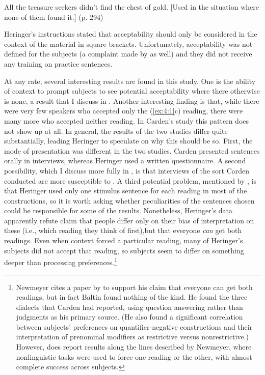 \ea\label{ex:4:3}
      All the treasure seekers didn't find the chest of gold. [Used in the situation where none of them found it.] (p. 294)    
\z

\noindent
Heringer's instructions stated that acceptability should only be considered  in the context of the material in square brackets. Unfortunately, acceptability was not defined for the subjects (a complaint made by \citet{Carden1970a} as well) and they did not receive any training on practice sentences.

At any rate, several interesting results are found in this study. One is the ability of context to prompt subjects to see potential acceptability where there otherwise is none, a result that I discuss in . Another interesting finding is that, while there were very few speakers who accepted only the (\ref{ex:4:1}c) reading, there were many more who accepted neither reading. In Carden's study  this  pattern does not show up at all. In general, the results of the two studies differ quite substantially, leading Heringer to speculate on why this should be so. First, the mode of presentation was different in the two studies. Carden presented sentences orally in interviews, whereas Heringer used a written questionnaire. A second possibility, which I discuss more fully in , is that interviews of the sort Carden conducted are more susceptible to . A third potential problem, mentioned by \citet{Carden1970a}, is that Heringer used only one stimulus sentence for each reading in most of the constructions, so it is worth asking whether peculiarities of the sentences chosen could be responsible for some of the results. Nonetheless, Heringer's data apparently refute  claim that people differ only on their bias of interpretation on these  (i.e., which reading they think of first),but that everyone \textit{can} get both readings. Even when context forced a particular reading, many of Heringer's subjects did not accept that reading, so subjects seem to differ on something deeper than processing preferences.\footnote{Newmeyer cites a paper by \citet{Baltin1977} to support his claim that everyone can get both readings, but in fact Baltin found nothing of the kind. He found the three dialects that Carden had reported, using question answering rather than judgments as his primary source. (He also found a significant correlation between subjects' preferences on quantifier-negative constructions and their interpretation of prenominal modifiers as restrictive versus nonrestrictive.) However, \citet{Labov1975}
does report results along the lines described by Newmeyer, where nonlinguistic tasks were used to force one reading or the other, with almost complete success across subjects.
}
